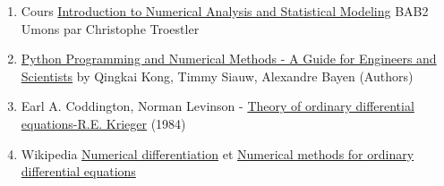 \documentclass[11pt]{article}
\makeatletter
\providecommand{\tightlist}{%
      \setlength{\itemsep}{0pt}\setlength{\parskip}{0pt}}
\newcommand{\boxspacing}{\kern\kvtcb@left@rule\kern\kvtcb@boxsep}
\newcommand{\prompt}[4]{
        \ttfamily\llap{{\color{#2}[#3]:\hspace{3pt}#4}}\vspace{-\baselineskip}
    }
\makeatother
\begin{document}
\begin{enumerate}
\def\labelenumi{\arabic{enumi}.}
\tightlist
\item
  Cours \href{}{Introduction to Numerical Analysis and Statistical
  Modeling} BAB2 Umons par Christophe Troestler\\
\item
  \href{https://pythonnumericalmethods.berkeley.edu/notebooks/Index.html}{Python
  Programming and Numerical Methods - A Guide for Engineers and
  Scientists} by Qingkai Kong, Timmy Siauw, Alexandre Bayen (Authors)
\item
  Earl A. Coddington, Norman Levinson - \href{}{Theory of ordinary
  differential equations-R.E. Krieger} (1984)
\item
  Wikipedia
  \href{https://en.wikipedia.org/wiki/Numerical_differentiation?oldformat=true}{Numerical
  differentiation} et
  \href{https://en.wikipedia.org/w/index.php?title=Numerical_methods_for_ordinary_differential_equations\&oldformat=true}{Numerical
  methods for ordinary differential equations}
\end{enumerate}

    \begin{tcolorbox}[breakable, size=fbox, boxrule=1pt, pad at break*=1mm,colback=cellbackground, colframe=cellborder]
\prompt{In}{incolor}{ }{\boxspacing}
\begin{Verbatim}[commandchars=\\\{\}]

\end{Verbatim}
\end{tcolorbox}


    
    
    
\end{document}
